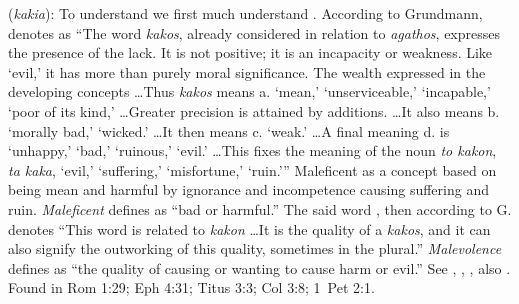 \item[Malevolence,]

(\textit{kakia}):
To understand  we first much understand . 
According to Grundmann,  denotes as ``The word \emph{kakos}, already considered in relation to \emph{agathos}, expresses the presence of the lack. It is not positive; it is an incapacity or weakness. Like `evil,' it has more than purely moral significance. The wealth expressed in the developing concepts \ldots Thus \emph{kakos} means a. `mean,' `unserviceable,' `incapable,' `poor of its kind,' \ldots Greater precision is attained by additions. \ldots It also means b. `morally bad,' `wicked.' \ldots It then means c. `weak.' \ldots A final meaning d. is `unhappy,' `bad,' `ruinous,' `evil.' \ldots This fixes the meaning of the noun \emph{to kakon}, \emph{ta kaka}, `evil,' `suffering,' `misfortune,' `ruin.'''  
Maleficent as a concept based on being mean and harmful by ignorance and incompetence causing suffering and ruin. \emph{Maleficent} defines as ``bad or harmful.'' 
The said word , then according to G. denotes ``This word is related to \emph{kakon} \ldots It is the quality of a \emph{kakos}, and it can also signify the outworking of this quality, sometimes in the plural.''
\emph{Malevolence} defines as ``the quality of causing or wanting to cause harm or evil.''
See , , , also .
Found in Rom 1:29; Eph 4:31; Titus 3:3; Col 3:8; 1~Pet 2:1.

